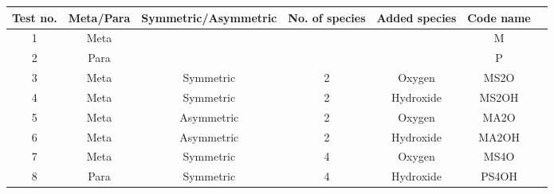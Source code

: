 \begin{table}[ht]
\begin{tabular}{|c|c|c|c|c|c|c|}
\hline
\multicolumn{1}{|l|}{Test no.} & \multicolumn{1}{l|}{Meta/Para} & \multicolumn{1}{l|}{Symmetric/Asymmetric} & No. of species & \multicolumn{1}{l|}{Added species} & \multicolumn{1}{l|}{Code name}      \\ \hline
1                              & Meta                           &                                           &                              &                                                  & M                                   \\ \hline
2                              & Para                           &                                           &                              &                                                   & P                                   \\ \hline
3                              & Meta                           & Symmetric                                 & 2                       & Oxygen                                              & MS2O                        \\ \hline
4                              & Meta                           & Symmetric                                 & 2                          & Hydroxide                                                 & MS2OH                              \\ \hline
5                              & Meta                           & Asymmetric                                & 2                      & Oxygen                                            & MA2O                        \\ \hline
6                             & Meta                           & Asymmetric                                & 2                         & Hydroxide                                                 & MA2OH                              \\ \hline
7                             & Meta                           & Symmetric                                 & 4                         & Oxygen                                                 & MS4O                              \\ \hline
8                             & Para                           & Symmetric                                 & 4                        & Hydroxide                                                 & PS4OH                              \\ \hline

\end{tabular}
\end{table}
